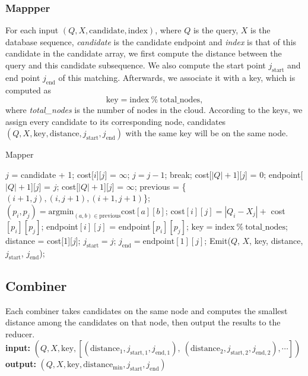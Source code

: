 \documentclass{article}
\begin{document}
\subsubsection*{Mappper}
For each input $(Q, X, \mathrm{candidate}, \mathrm{index})$, where $Q$ is the query, $X$ is the database sequence, \emph{candidate} is the candidate endpoint and \emph{index} is that of this candidate in the candidate array, we first compute the distance between the query and this candidate subsequence. We also compute the start point $j_{\mathrm{start}}$ and end point $j_{\mathrm{end}}$ of this matching. Afterwards, we associate it with a key, which is computed as $$\mathrm{key} = \mathrm{index}\ \%\ \mathrm{total\_nodes},$$ where \emph{total\_nodes} is the number of nodes in the cloud. According to the keys, we assign every candidate to its corresponding node, candidates $(Q, X, \mathrm{key}, \mathrm{distance}, j_{\mathrm{start}}, j_{\mathrm{end}})$ with the same key will be on the same node. \par

\begin{algorithm}
	\caption{Mapper}
	\begin{algorithmic}[1]
	\State $j$ = candidate + 1;
		\State cost[$i$][$j$] = $\infty$;
	\EndFor
		\State $j = j - 1$;
			\State break;
		\EndIf
			\State cost[$|Q|+1$][$j$] = 0;
			\State endpoint[$|Q|+1$][$j$] = $j$;
		\Else
			\State cost[$|Q|+1$][$j$] = $\infty$;
		\EndIf
			\State previous = \{$(i+1, j), (i, j+1), (i+1, j+1)$\};
			\State $(p_i, p_j) = \mathrm{argmin}_{(a,b)\in\mathrm{previous}}\mathrm{cost}[a][b]$;
			\State cost$[i][j] = |Q_i - X_j| +$ cost$[p_i][p_j]$;
			\State endpoint$[i][j]$ = endpoint$[p_i][p_j]$;
		\EndFor
		\State $\mathrm{key} = \mathrm{index}\ \%\ \mathrm{total\_nodes}$;
		\State distance = cost[1][$j$];
		\State $j_{\mathrm{start}} = j$;
		\State $j_{\mathrm{end}} = \mathrm{endpoint}[1][j]$;
		\State Emit($Q$, $X$, key, distance, $j_{\mathrm{start}}$, $j_{\mathrm{end}}$);
	\EndWhile
	\end{algorithmic}
\end{algorithm}

\subsection*{Combiner}
Each combiner takes candidates on the same node and computes the smallest distance among the candidates on that node, then output the results to the reducer.\\
\textbf{input:} $(Q, X, \mathrm{key}, [(\mathrm{distance_1}, j_{\mathrm{start},1}, j_{\mathrm{end},1}),\ (\mathrm{distance_2}, j_{\mathrm{start},2}, j_{\mathrm{end},2}), \cdots])$ \\
\textbf{output:} $(Q, X, \mathrm{key}, \mathrm{distance_{min}}, j_{\mathrm{start}}, j_{\mathrm{end}})$ \par
\end{document}
